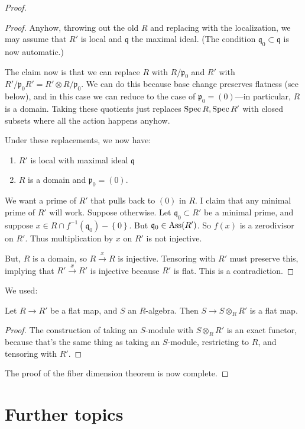 \begin{proof}
\begin{proof}
Anyhow, throwing out the old $R$ and replacing with the localization, we may
assume that $R'$ is local and $\mathfrak{q}$ the maximal ideal. (The condition
$\mathfrak{q}_0 \subset \mathfrak{q}$ is now automatic.) 

The claim now is that we can replace $R$ with $R/\mathfrak{p}_0$ and $R'$ with
$R'/\mathfrak{p}_0 R' = R' \otimes R/\mathfrak{p}_0$. We can do this because
base change preserves flatness (see below), and in this case we can reduce to the case of
$\mathfrak{p}_0 = (0)$---in particular, $R$ is a domain. 
Taking these quotients just replaces $\operatorname{Spec} R, \operatorname{Spec} R'$ with closed subsets
where all the action happens anyhow.

Under these replacements, we now have:
\begin{enumerate}
\item $R'$ is local with maximal ideal $\mathfrak{q}$ 
\item $R$ is a domain and $\mathfrak{p}_0 = (0)$.
\end{enumerate}
We want a prime of $R'$ that pulls back to $(0)$ in $R$. I claim that any
minimal prime of $R'$ will work. 
Suppose otherwise. Let $\mathfrak{q}_0 \subset R'$ be a minimal prime, and
suppose $x \in R \cap f^{-1}(\mathfrak{q}_0) - \left\{0\right\}$. But
$\mathfrak{q}_0 \in \operatorname{Ass}(R')$. So $f(x)$ is
a zerodivisor on $R'$. Thus multiplication by $x$ on $R'$ is not injective. 

But, $R$ is a domain, so $R \stackrel{x}{\to} R$ is injective. Tensoring with
$R'$ must preserve this, implying that $R' \stackrel{x}{\to} R'$ is injective
because $R'$ is flat. This is a contradiction.
\end{proof} 

We used:
\begin{lemma} 
Let $R \to R'$ be a flat map, and $S$ an $R$-algebra. Then $S \to S \otimes_R
R'$ is a flat map.
\end{lemma} 
\begin{proof} 
The construction of taking an $S$-module with $S \otimes_R R'$ is an exact
functor, because that's the same thing as taking an $S$-module, restricting to
$R$, and tensoring with $R'$.
\end{proof} 
The proof of the fiber dimension theorem is now complete.

\end{proof} 

\section{Further topics}

